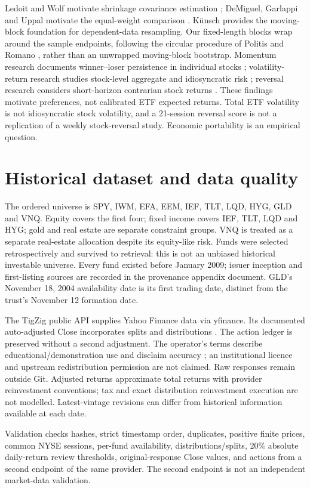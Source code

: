 \documentclass[11pt,a4paper]{article}
\begin{document}
Ledoit and Wolf motivate shrinkage covariance estimation \cite{lw}; DeMiguel,
Garlappi and Uppal motivate the equal-weight comparison \cite{dgu}.
K\"unsch \cite{kunsch} provides the moving-block foundation for dependent-data
resampling. Our fixed-length blocks wrap around the sample endpoints, following
the circular procedure of Politis and Romano \cite{pr}, rather than an
unwrapped moving-block bootstrap.
Momentum research documents winner--loser persistence in individual stocks
\cite{jt}; volatility-return research studies stock-level aggregate and
idiosyncratic risk \cite{ang}; reversal research considers short-horizon
contrarian stock returns \cite{lehmann}. These findings motivate preferences,
not calibrated ETF expected returns. Total ETF volatility is not idiosyncratic
stock volatility, and a 21-session reversal score is not a replication of a
weekly stock-reversal study. Economic portability is an empirical question.
\section{Historical dataset and data quality}
The ordered universe is SPY, IWM, EFA, EEM, IEF, TLT, LQD, HYG, GLD and VNQ.
Equity covers the first four; fixed income covers IEF, TLT, LQD and HYG;
gold and real estate are separate constraint groups. VNQ is treated as a separate
real-estate allocation despite its equity-like risk. Funds were selected
retrospectively and survived to retrieval: this is not an unbiased historical
investable universe. Every fund existed before January 2009; issuer inception
and first-listing sources are recorded in the provenance appendix document.
GLD's November 18, 2004 availability date is its first trading date, distinct
from the trust's November 12 formation date.

The TigZig public API supplies Yahoo Finance data via yfinance. Its documented
auto-adjusted Close incorporates splits and distributions \cite{tigzig}.
The action ledger is preserved without a second adjustment. The operator's
terms describe educational/demonstration use and disclaim accuracy \cite{terms};
an institutional licence and upstream redistribution permission are not claimed.
Raw responses remain outside Git. Adjusted returns approximate total returns
with provider reinvestment conventions; tax and exact distribution reinvestment
execution are not modelled. Latest-vintage revisions can differ from historical
information available at each date.

Validation checks hashes, strict timestamp order, duplicates, positive finite
prices, common NYSE sessions, per-fund availability, distributions/splits,
20\% absolute daily-return review thresholds, original-response Close values,
and actions from a second endpoint of the same provider. The second endpoint
is not an independent market-data validation.
\end{document}
